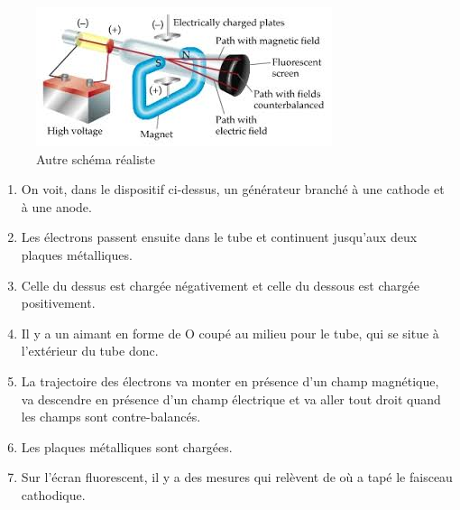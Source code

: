 \documentclass[../main.tex]{subfiles}
\begin{document}
\begin{figure}[h!]
    \centering
    \includegraphics[scale=0.9]{images/08.JJ-Thomson..jpg}
    \caption{Autre schéma réaliste}
    \label{fig:my_label}
\end{figure}

\begin{enumerate}
    \item On voit, dans le dispositif ci-dessus, un générateur branché à une cathode et à une anode.
    \item Les électrons passent ensuite dans le tube et continuent jusqu'aux deux plaques métalliques.
    \item Celle du dessus est chargée négativement et celle du dessous est chargée positivement.
    \item Il y a un aimant en forme de O coupé au milieu pour le tube, qui se situe à l'extérieur du tube donc.
    \item La trajectoire des électrons va monter en présence d'un champ magnétique, va descendre en présence d'un champ électrique et  va aller tout droit quand les champs sont contre-balancés. 
    \item Les plaques métalliques sont chargées.
    \item Sur l'écran fluorescent, il y a des mesures qui relèvent de où a tapé le faisceau cathodique. 
\end{enumerate}
\end{document}
